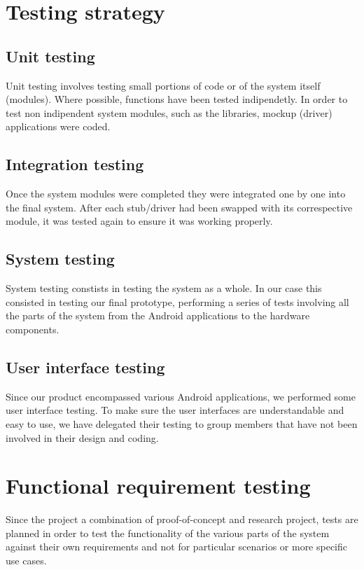 \section{Testing strategy}

\subsection{Unit testing}
Unit testing involves testing small portions of code or of the system itself
(modules). Where possible, functions have been tested indipendetly. In order to
test non indipendent system modules, such as the libraries, mockup (driver)
applications were coded.

\subsection{Integration testing}
Once the system modules were completed they were integrated one by one into the
final system. After each stub/driver had been swapped with its correspective
module, it was tested again to ensure it was working properly.

\subsection{System testing}
System testing constists in testing the system as a whole.
In our case this consisted in testing our final prototype, performing a series
of tests involving all the parts of the system from the Android applications
to the hardware components.

\subsection{User interface testing}
Since our product encompassed various Android applications, we performed some
user interface testing. To make sure the user interfaces are understandable and
easy to use, we have delegated their testing to group members that have not been
involved in their design and coding.

\section{Functional requirement testing}
Since the project a combination of proof-of-concept and research project,
tests are planned in order to test the functionality of the various parts of the
system against their own requirements and not for particular scenarios or more
specific use cases.

